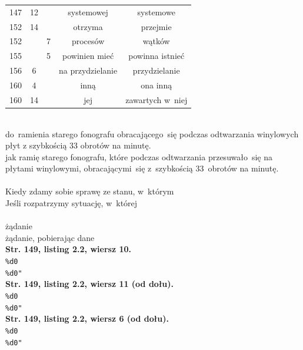 \documentclass[a4paper,11pt]{article}
\numberwithin{equation}{section}
\begin{document}
\begin{center}
\begin{tabular}{|c|c|c|c|c|}
    147 & 12 & & systemowej & systemowe \\
    152 & 14 & & otrzyma & przejmie \\
    152 & & \hphantom{0}7 & procesów & wątków \\
    155 & & \hphantom{0}5 & powinien mieć & powinna istnieć \\
    156 & \hphantom{0}6 & & na przydzielanie & przydzielanie \\
    160 & \hphantom{0}4 & & inną & ona inną \\
    160 & 14 & & jej & zawartych w~niej \\
    \hline
  \end{tabular}

\end{center}

\VerSpaceSix


\noindent
{} \\
\Jest do~ramienia starego fonografu obracającego~się podczas odtwarzania
winylowych płyt z szybkością 33 obrotów na minutę. \\
\PowinnoByc jak ramię starego fonografu, które podczas odtwarzania
przesuwało~się na płytami winylowymi, obracającymi~się z~szybkością
33~obrotów na minutę. \\
 \\
\Jest Kiedy zdamy sobie sprawę ze stanu, w~którym \\
\PowinnoByc Jeśli rozpatrzymy sytuację, w~której \\
 \\
\Jest żądanie \\
\PowinnoByc żądanie, pobierając dane \\
\textbf{Str. 149, listing 2.2, wiersz 10.} \\
\Jest \texttt{\%d0} \\
\PowinnoByc \texttt{\%d0"} \\
\textbf{Str. 149, listing 2.2, wiersz 11 (od dołu).} \\
\Jest \texttt{\%d0} \\
\PowinnoByc \texttt{\%d0"} \\
\textbf{Str. 149, listing 2.2, wiersz 6 (od dołu).} \\
\Jest \texttt{\%d0} \\
\PowinnoByc \texttt{\%d0"} \\












\printbibliography





\end{document}
